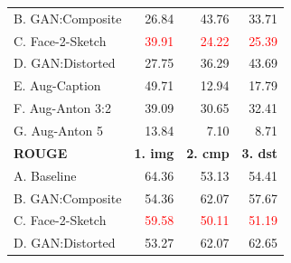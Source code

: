 \documentclass[aspectratio=1610]{beamer} %
\begin{document}
\begin{frame}
\begin{table}[htbp]
{\begin{tabular}{|l|rrr|}
B. GAN:Composite        & 26.84                                                    & 43.76                                               & 33.71                                                      \\
C. Face-2-Sketch       & \textcolor{red}{39.91}                                                 &  \textcolor{red}{24.22}                                                     & \textcolor{red}{25.39}                                                      \\
D. GAN:Distorted         & 27.75                                                    & 36.29                                                     & 43.69
\\
\hdashline
E. Aug-Caption             & 49.71                                                  & 12.94                                                     & 17.79                                                      \\
F. Aug-Anton 3:2 & 39.09                                                    & 30.65                                                & 32.41                                                 \\
G. Aug-Anton 5   & 13.84                                                    & 7.10                                                      & 8.71                                                       \\
\hline
\hline
\textbf{ROUGE} & \textbf{1. img} & \textbf{2. cmp} & \textbf{3. dst} \\ 
\hline
A. Baseline          & 64.36                                                  & 53.13                                                     & 54.41                                                      \\
B. GAN:Composite        & 54.36                                                    & 62.07                                                & 57.67                                                      \\
C. Face-2-Sketch       & \textcolor{red}{59.58}                                                &  \textcolor{red}{50.11}                                                     &  \textcolor{red}{51.19}                                                      \\
D. GAN:Distorted         & 53.27                                                    & 62.07                                                     & 62.65                                                   \\

\end{tabular}}
\end{table}
\end{frame}
\end{document}
